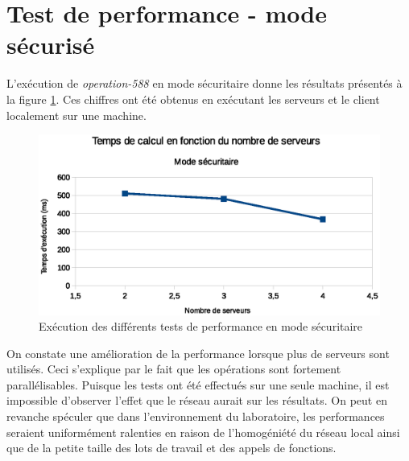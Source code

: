 \section{Test de performance - mode sécurisé}
L'exécution de \emph{operation-588} en mode sécuritaire donne les résultats présentés à la figure \ref{fig:safe}. Ces chiffres ont été obtenus en exécutant les serveurs et le client localement sur une machine. 

\begin{figure}
  \includegraphics[width=\linewidth]{safe_exec.eps}
  \caption{ Exécution des différents tests de performance en mode sécuritaire }
  \label{fig:safe}
\end{figure}

On constate une amélioration de la performance lorsque plus de serveurs sont utilisés. Ceci s'explique par le fait que les
opérations sont fortement parallélisables. Puisque les tests ont été effectués sur une seule machine, il est impossible d'observer l'effet que le réseau aurait sur les résultats. On peut en revanche spéculer que dans l'environnement du laboratoire, les performances seraient uniformément ralenties en raison de l'homogéniété du réseau local ainsi que de la petite taille des lots de travail et des appels de fonctions. 

